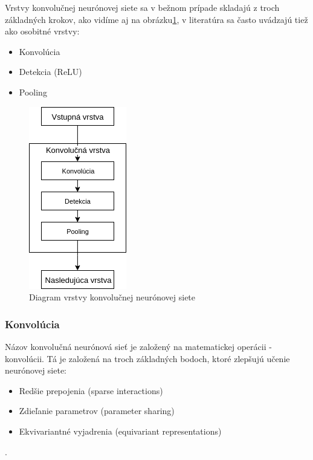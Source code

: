 Vrstvy konvolučnej neurónovej siete sa v bežnom prípade skladajú z troch základných krokov, ako vidíme aj na obrázku\ref{fig:convo}, v literatúra sa často uvádzajú tiež ako osobitné vrstvy:
\begin{itemize}
	\item Konvolúcia
	\item Detekcia (ReLU)
	\item Pooling
\end{itemize}


\begin{figure}[H]
	\centering
	\includegraphics[width=0.2\linewidth]{img/convo}
	\caption{Diagram vrstvy konvolučnej neurónovej siete}
	\label{fig:convo}
\end{figure}


\subsubsection{Konvolúcia}
Názov konvolučná neurónová sieť je založený na matematickej operácii - konvolúcii. 
Tá je založená na troch základných bodoch, ktoré zlepšujú učenie neurónovej siete:
\begin{itemize}
	\item Redšie prepojenia (sparse interactions)
	\item Zdieľanie parametrov (parameter sharing)
	\item Ekvivariantné vyjadrenia (equivariant representations)
\end{itemize}
\cite{goodfellow2016deep}.\\

